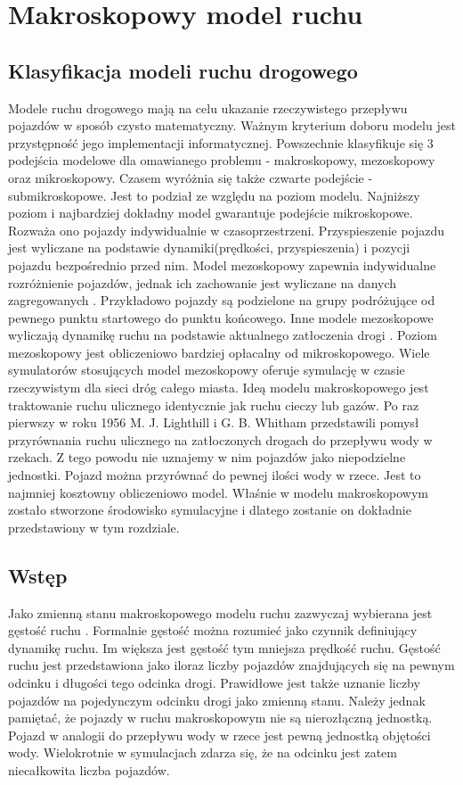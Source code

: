 \documentclass[12pt]{book}
\theoremstyle{plain}
\begin{document}
\chapter{Makroskopowy model ruchu} \label{chapter:makroskopowy_model_ruchu}
\section{Klasyfikacja modeli ruchu drogowego}
Modele ruchu drogowego mają na celu ukazanie rzeczywistego przepływu pojazdów w sposób czysto matematyczny. Ważnym kryterium doboru modelu jest przystępność jego implementacji informatycznej. Powszechnie klasyfikuje się 3 podejścia modelowe dla omawianego problemu \cite{CompareModels} - makroskopowy, mezoskopowy oraz mikroskopowy. Czasem \cite{multilevel} wyróżnia się także czwarte podejście - submikroskopowe. Jest to podział ze względu na poziom modelu. Najniższy poziom i najbardziej dokładny model gwarantuje podejście mikroskopowe. Rozważa ono pojazdy indywidualnie w czasoprzestrzeni. Przyspieszenie pojazdu jest wyliczane na podstawie dynamiki(prędkości, przyspieszenia) i pozycji pojazdu bezpośrednio przed nim. Model mezoskopowy zapewnia indywidualne rozróżnienie pojazdów, jednak ich zachowanie jest wyliczane na danych zagregowanych \cite{mesoscopic}. Przykładowo pojazdy są podzielone na grupy podróżujące od pewnego punktu startowego do punktu końcowego. Inne modele mezoskopowe wyliczają dynamikę ruchu na podstawie aktualnego zatłoczenia drogi \cite{mesoscopic2}. Poziom mezoskopowy jest obliczeniowo bardziej opłacalny od mikroskopowego.
Wiele symulatorów stosujących model mezoskopowy oferuje symulację w czasie rzeczywistym dla sieci dróg całego miasta\cite{vu2017high}. Ideą modelu makroskopowego jest traktowanie ruchu ulicznego identycznie jak ruchu cieczy lub gazów. Po raz pierwszy w roku 1956 M. J. Lighthill i G. B. Whitham \cite{lwr} przedstawili pomysł przyrównania ruchu ulicznego na zatłoczonych drogach do przepływu wody w rzekach. Z tego powodu nie uznajemy w nim pojazdów jako niepodzielne jednostki. Pojazd można przyrównać do pewnej ilości wody w rzece.
Jest to najmniej kosztowny obliczeniowo model. Właśnie w modelu makroskopowym zostało stworzone środowisko symulacyjne i dlatego zostanie on dokładnie przedstawiony w tym rozdziale.

\section{Wstęp}
Jako zmienną stanu makroskopowego modelu ruchu zazwyczaj wybierana jest gęstość ruchu \cite{gottlich,CompareModels}. Formalnie gęstość można rozumieć jako czynnik definiujący dynamikę ruchu. Im większa jest gęstość tym mniejsza prędkość ruchu. Gęstość ruchu \cite{helbing2001master} jest przedstawiona jako iloraz liczby pojazdów znajdujących się na pewnym odcinku i długości tego odcinka drogi. Prawidłowe jest także uznanie liczby pojazdów na pojedynczym odcinku drogi jako zmienną stanu. Należy jednak pamiętać, że pojazdy w ruchu makroskopowym nie są nierozłączną jednostką. Pojazd w analogii do przepływu wody w rzece jest pewną jednostką objętości wody. Wielokrotnie w symulacjach zdarza się, że na odcinku jest zatem niecałkowita liczba pojazdów.
\end{document}
